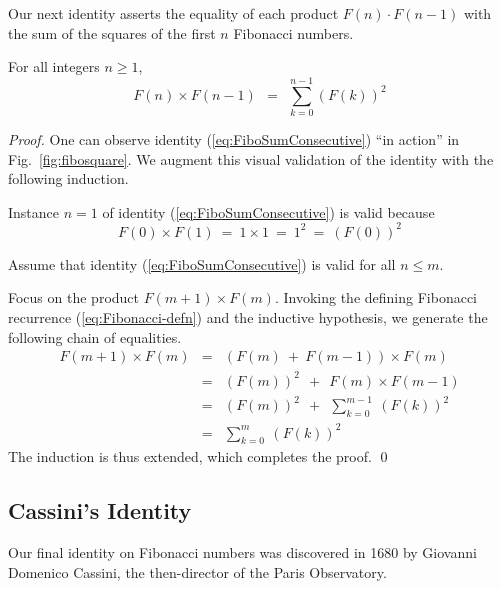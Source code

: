 Our next identity asserts the equality of each product $F(n) \cdot F(n-1)$ with the sum of the squares of the first $n$ Fibonacci numbers.

\begin{prop} 
\label{thm:FiboSumConsecutive}
For all integers $n \geq 1$,
\begin{equation}
\label{eq:FiboSumConsecutive}
F(n) \times F(n-1) \ \ = \ \ \sum_{k=0}^{n-1} (F(k))^2
\end{equation}
\end{prop}

\begin{proof}
One can observe identity (\ref{eq:FiboSumConsecutive}) ``in action'' in Fig.~\ref{fig:fibosquare}.  We augment this visual validation of the identity with the following induction.

\medskip

Instance $n=1$ of identity (\ref{eq:FiboSumConsecutive}) is valid because
\[ F(0) \times F(1) \ = \ 1 \times 1 \ = \ 1^2 \ = \ (F(0))^2 \]

\medskip

Assume that identity (\ref{eq:FiboSumConsecutive}) is valid for all $n \leq m$.

\medskip

Focus on the product $F(m+1) \times F(m)$.  Invoking the defining Fibonacci recurrence
(\ref{eq:Fibonacci-defn}) and the inductive hypothesis, we generate the following chain of equalities.
\begin{eqnarray*}
F(m+1) \times F(m)
 & = &
   (F(m) \ + \ F(m-1)) \times F(m) \\
 & = &
   (F(m))^2 \ \ + \ \ F(m) \times F(m-1)  \\
 & = & 
   (F(m))^2  \ \ + \ \ \sum_{k=0}^{m-1} \ (F(k))^2  \\
 & = &
   \sum_{k=0}^{m} \ (F(k))^2
\end{eqnarray*}
The induction is thus extended, which completes the proof.  \qed
\end{proof}


\subsection{Cassini's Identity}
\label{sec:cassini}


Our final identity on Fibonacci numbers was discovered in 1680 by Giovanni Domenico Cassini, the then-director of the Paris Observatory.

